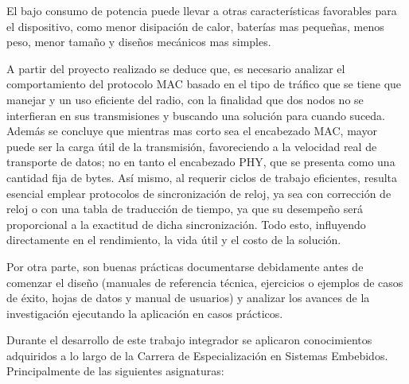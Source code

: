 El bajo consumo de potencia puede llevar a otras características favorables para el dispositivo, como menor disipación de calor, baterías mas pequeñas, menos peso, menor tamaño y diseños mecánicos mas simples.

A partir del proyecto realizado se deduce que, es necesario analizar el comportamiento del protocolo MAC basado en el tipo de tráfico que se tiene que manejar y un uso eficiente del radio, con la finalidad que dos nodos no se interfieran en sus transmisiones y buscando una solución para cuando suceda. Además se concluye que mientras mas corto sea el encabezado MAC, mayor puede ser la carga útil de la transmisión, favoreciendo a la velocidad real de transporte de datos; no en tanto el encabezado PHY, que se presenta como una cantidad fija de bytes. Así mismo, al requerir ciclos de trabajo eficientes, resulta esencial emplear protocolos de sincronización de reloj, ya sea con corrección de reloj o con una tabla de traducción de tiempo, ya que su desempeño será proporcional a la exactitud de dicha sincronización. Todo esto, influyendo directamente en el rendimiento, la vida útil y el costo de la solución.


Por otra parte, son buenas prácticas documentarse debidamente antes de comenzar el diseño (manuales de referencia técnica, ejercicios o ejemplos de casos de éxito, hojas de datos y manual de usuarios) y analizar los avances de la investigación ejecutando la aplicación en casos prácticos.

\medskip
Durante el desarrollo de este trabajo integrador se aplicaron conocimientos adquiridos a lo largo de la Carrera de Especialización en Sistemas Embebidos. Principalmente de las siguientes asignaturas: 

